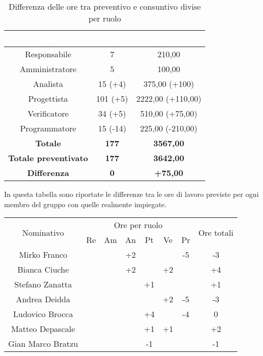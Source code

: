 \begin{flushleft}
	\begin{table}[H]
	\begin{center}
		\begin{tabular}{ccc}
			\rowcolor{coolblack}
			\hline
			\textcolor{white}{Ruolo} & \textcolor{white}{Ore} & \textcolor{white}{Costo in \euro}\\
			\hline
			Responsabile   & 7   		&  210,00  			 	\\ 
			Amministratore & 5   		&  100,00 			 	\\ 
			Analista       & 15 (+4)	  	&  375,00 (+100)   	\\ 
			Progettista    & 101 (+5)	&  2222,00 (+110,00) 	\\ 
			Verificatore   & 34 (+5)  	&  510,00 (+75,00) 		\\ 
			Programmatore  & 15 (-14)   &  225,00 (-210,00) 	\\ \hline
			\textbf{Totale}& \textbf{177} & \textbf{3567,00}	\\ \hline 
			\textbf{Totale preventivato}& \textbf{177} & \textbf{3642,00}\\ \hline 
			\textbf{Differenza}& \textbf{0} & \textbf{+75,00 }	\\ \hline  
		\end{tabular}
		
		\caption{Differenza delle ore tra preventivo e consuntivo divise per ruolo} 
	\end{center}
\end{table}
  \clearpage
  
  In questa tabella  sono riportate le differenze tra le ore di lavoro previste per ogni membro del gruppo con quelle realmente impiegate.\\
  
    \begin{table}[H]
  	\begin{center}
    \begin{tabularx}{\textwidth}{|c|cccccc|c|}
  			
  	\hline
  	\multirow{2}{*}{Nominativo} & \multicolumn{6}{c|}{Ore per ruolo} & \multirow{2}{*}{Ore totali} \\ \cline{2-7}
  					  & Re & Am & An & Pt & Ve & Pr &      \\ \hline
  	\endhead
  	Mirko Franco       &   &    &  +2  &    &  & -5  & -3       \\ \hline
  	Bianca Ciuche      &   &    & +2   &    & +2  &   & +4        \\ \hline
  	Stefano Zanatta    &   &    &  & +1 &   &  & +1        \\ \hline
  	Andrea Deidda      &   &  &   &   &   +2 &   -5 & -3  		\\ \hline
  	Ludovico Brocca    &   &  &   & +4  &  &  -4 & 0        \\ \hline
  	Matteo Depascale   &   &  &   & +1   &   +1 &   & +2 		\\ \hline
  	Gian Marco Bratzu  &   &  &   & -1  &  &   & -1        \\ \hline
    

\end{tabularx}
\end{center}
\end{table}
\end{flushleft}
